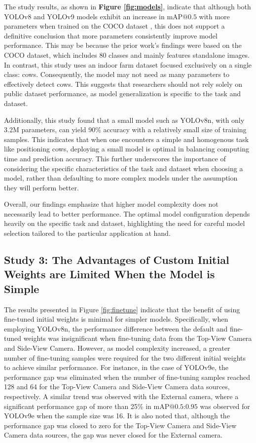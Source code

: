The study results, as shown in \textbf{Figure \ref{fig:models}}, indicate that although both YOLOv8 \cite{ultralyticsYOLOv8} and YOLOv9 \cite{wang2024yolov9} models exhibit an increase in $\text{mAP@{0.5}}$ with more parameters when trained on the COCO dataset \cite{lin2014microsoft}, this does not support a definitive conclusion that more parameters consistently improve model performance. This may be because the prior work's findings were based on the COCO dataset, which includes 80 classes and mainly features standalone images. In contrast, this study uses an indoor farm dataset focused exclusively on a single class: cows. Consequently, the model may not need as many parameters to effectively detect cows. This suggests that researchers should not rely solely on public dataset performance, as model generalization is specific to the task and dataset.

Additionally, this study found that a small model such as YOLOv8n, with only 3.2M parameters, can yield 90\% accuracy with a relatively small size of training samples. This indicates that when one encounters a simple and homogenous task like positioning cows, deploying a small model is optimal in balancing computing time and prediction accuracy. This further underscores the importance of considering the specific characteristics of the task and dataset when choosing a model, rather than defaulting to more complex models under the assumption they will perform better.

Overall, our findings emphasize that higher model complexity does not necessarily lead to better performance. The optimal model configuration depends heavily on the specific task and dataset, highlighting the need for careful model selection tailored to the particular application at hand.

\subsection*{Study 3: The Advantages of Custom Initial Weights are Limited When the Model is Simple}

The results presented in Figure \ref{fig:finetune} indicate that the benefit of using fine-tuned initial weights is minimal for simpler models. Specifically, when employing YOLOv8n, the performance difference between the default and fine-tuned weights was insignificant when fine-tuning data from the Top-View Camera and Side-View Camera. However, as model complexity increased, a greater number of fine-tuning samples were required for the two different initial weights to achieve similar performance. For instance, in the case of YOLOv9e, the performance gap was eliminated when the number of fine-tuning samples reached 128 and 64 for the Top-View Camera and Side-View Camera data sources, respectively. A similar trend was observed with the External camera, where a significant performance gap of more than 25\% in $\text{mAP@{0.5:0.95}}$ was observed for YOLOv9e when the sample size was 16. It is also noted that, although the performance gap was closed to zero for the Top-View Camera and Side-View Camera data sources, the gap was never closed for the External camera.

